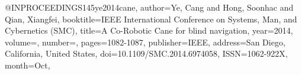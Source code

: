 @INPROCEEDINGS{145ye2014cane,
author={Ye, Cang and Hong, Soonhac and Qian, Xiangfei},
booktitle={IEEE International Conference on Systems, Man, and Cybernetics (SMC)}, 
title={A Co-Robotic Cane for blind navigation}, 
year={2014},
volume={},
number={},
pages={1082-1087},
publisher={IEEE},
address={San Diego, California, United States},
doi={10.1109/SMC.2014.6974058},
ISSN={1062-922X},
month={Oct},}